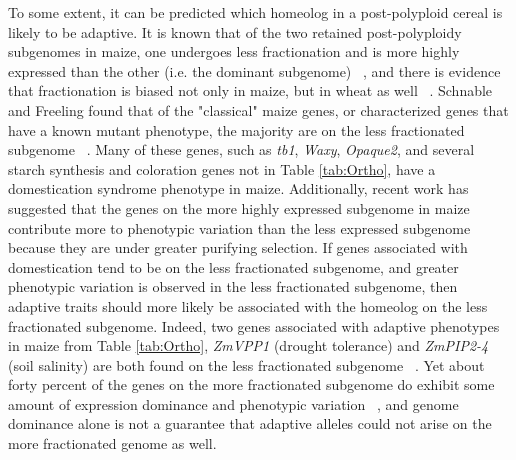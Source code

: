 \documentclass[12pt]{article}
\begin{document}
To some extent, it can be predicted which homeolog in a post-polyploid cereal is likely to be adaptive. It is known that of the two retained post-polyploidy subgenomes in maize, one undergoes less fractionation and is more highly expressed than the other (i.e. the dominant subgenome) ~\citep{Woodhouse2010, Schnable2011}, and there is evidence that fractionation is biased not only in maize, but in wheat as well ~\citep{Eckardt2014}.  Schnable and Freeling found that of the "classical" maize genes, or characterized genes that have a known mutant phenotype, the majority are on the less fractionated subgenome ~\citep{Schnable20112}. Many of these genes, such as \textit{tb1}, \textit{Waxy}, \textit{Opaque2}, and several starch synthesis and coloration genes not in Table \ref{tab:Ortho}, have a domestication syndrome phenotype in maize.  Additionally, recent work has suggested that the genes on the more highly expressed subgenome in maize contribute more to phenotypic variation than the less expressed subgenome ~\citep{RennyByfield2017} because they are under greater purifying selection.  If genes associated with domestication tend to be on the less fractionated subgenome, and greater phenotypic variation is observed in the less fractionated subgenome, then adaptive traits should more likely be associated with the homeolog on the less fractionated subgenome.  Indeed, two genes associated with adaptive phenotypes in maize from Table \ref{tab:Ortho}, \textit{ZmVPP1} (drought tolerance) and \textit{ZmPIP2-4} (soil salinity) are both found on the less fractionated subgenome ~\citep{Schnable20112}. Yet about forty percent of the genes on the more fractionated subgenome do exhibit some amount of expression dominance and phenotypic variation ~\citep{RennyByfield2017}, and genome dominance alone is not a guarantee that adaptive alleles could not arise on the more fractionated genome as well.  
\end{document}
